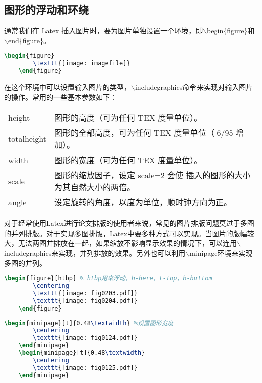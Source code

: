 \documentclass[cn,10pt,math=newtx,citestyle=gb7714-2015,bibstyle=gb7714-2015]{elegantbook}
\begin{document}
\subsection{图形的浮动和环绕}

通常我们在 Latex 插入图片时，要为图片单独设置一个环境，即$\backslash$begin\{figure\}和$\backslash$end\{figure\}。
\begin{lstlisting}[language=tex]
	\begin{figure}
		\texttt{[image: imagefile]}
	\end{figure}
\end{lstlisting}

在这个环境中可以设置输入图片的类型，$\backslash$includegraphics命令来实现对输入图片的操作。常用的一些基本参数如下：

\begin{table}[h]
	\centering
	\begin{tabular}{ll}
		height &	图形的高度（可为任何 TEX 度量单位）。\\
		totalheight	& 图形的全部高度，可为任何 TEX 度量单位（ 6/95 增加）。\\
		width &	图形的宽度（可为任何 TEX 度量单位）。\\
		scale	& 图形的缩放因子，设定 scale=2 会使 插入的图形的大小为其自然大小的两倍。\\
		angle &	设定旋转的角度，以度为单位，顺时钟方向为正。\\
	\end{tabular}
\end{table}

对于经常使用Latex进行论文排版的使用者来说，常见的图片排版问题莫过于多图的并列排版。对于实现多图排版，Latex中要多种方式可以实现。当图片的版幅较大，无法两图并排放在一起，如果缩放不影响显示效果的情况下，可以连用$\backslash$includegraphics来实现，并列排放的效果。另外也可以利用$\backslash$minipage环境来实现多图的并列。

\begin{lstlisting}[language=tex]
	\begin{figure}[htbp] % htbp用来浮动，h-here，t-top，b-buttom
		\centering
		\texttt{[image: fig0203.pdf]}
		\texttt{[image: fig0204.pdf]}
	\end{figure}
\end{lstlisting}

\begin{lstlisting}[language=tex]
	\begin{minipage}[t]{0.48\textwidth} %设置图形宽度
		\centering
		\texttt{[image: fig0124.pdf]}  
	\end{minipage}
	\begin{minipage}[t]{0.48\textwidth}
		\centering
		\texttt{[image: fig0125.pdf]}  
	\end{minipage}
\end{lstlisting}
\end{document}
